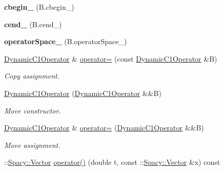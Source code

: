 \begin{DoxyCompactItemize}
\item 
\hypertarget{classSpacy_1_1Kaskade_1_1DynamicC1Operator_a040ae302d24ced4863913d665ebab5ca}{{\bfseries cbegin\-\_\-} (\-B.\-cbegin\-\_\-)}\label{classSpacy_1_1Kaskade_1_1DynamicC1Operator_a040ae302d24ced4863913d665ebab5ca}

\item 
\hypertarget{classSpacy_1_1Kaskade_1_1DynamicC1Operator_a40bcd91e159349f05c843fc58c0e2965}{{\bfseries cend\-\_\-} (\-B.\-cend\-\_\-)}\label{classSpacy_1_1Kaskade_1_1DynamicC1Operator_a40bcd91e159349f05c843fc58c0e2965}

\item 
\hypertarget{classSpacy_1_1Kaskade_1_1DynamicC1Operator_afccb8a9e7177a849cf419b33da5f9728}{{\bfseries operator\-Space\-\_\-} (\-B.\-operator\-Space\-\_\-)}\label{classSpacy_1_1Kaskade_1_1DynamicC1Operator_afccb8a9e7177a849cf419b33da5f9728}

\item 
\hyperlink{classSpacy_1_1Kaskade_1_1DynamicC1Operator}{\-Dynamic\-C1\-Operator} \& \hyperlink{classSpacy_1_1Kaskade_1_1DynamicC1Operator_aa096a4b6941e19a9855eb1b2fa8ab156}{operator=} (const \hyperlink{classSpacy_1_1Kaskade_1_1DynamicC1Operator}{\-Dynamic\-C1\-Operator} \&\-B)
\begin{DoxyCompactList}\small\item\em \-Copy assignment. \end{DoxyCompactList}\item 
\hyperlink{classSpacy_1_1Kaskade_1_1DynamicC1Operator_ab9075eaef04eb6242f309abf9befa616}{\-Dynamic\-C1\-Operator} (\hyperlink{classSpacy_1_1Kaskade_1_1DynamicC1Operator}{\-Dynamic\-C1\-Operator} \&\&\-B)
\begin{DoxyCompactList}\small\item\em \-Move constructor. \end{DoxyCompactList}\item 
\hyperlink{classSpacy_1_1Kaskade_1_1DynamicC1Operator}{\-Dynamic\-C1\-Operator} \& \hyperlink{classSpacy_1_1Kaskade_1_1DynamicC1Operator_aa95065de233557308cb356f93c75f6dc}{operator=} (\hyperlink{classSpacy_1_1Kaskade_1_1DynamicC1Operator}{\-Dynamic\-C1\-Operator} \&\&\-B)
\begin{DoxyCompactList}\small\item\em \-Move assignment. \end{DoxyCompactList}\item 
\hypertarget{classSpacy_1_1Kaskade_1_1DynamicC1Operator_adc1e1c381ce922b284e89c669f0ac3de}{\-::\hyperlink{classSpacy_1_1Vector}{\-Spacy\-::\-Vector} \hyperlink{classSpacy_1_1Kaskade_1_1DynamicC1Operator_adc1e1c381ce922b284e89c669f0ac3de}{operator()} (double t, const \-::\hyperlink{classSpacy_1_1Vector}{\-Spacy\-::\-Vector} \&x) const }\label{classSpacy_1_1Kaskade_1_1DynamicC1Operator_adc1e1c381ce922b284e89c669f0ac3de}


\end{DoxyCompactItemize}
